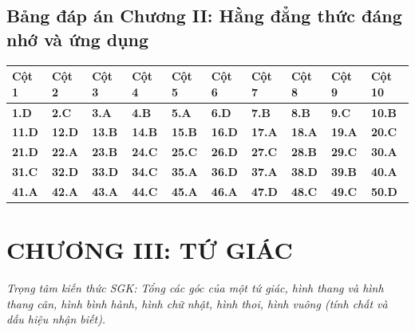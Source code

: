 \documentclass[11pt,a4paper]{article}
\begin{document}
\subsection*{\color{primary} Bảng đáp án Chương II: Hằng đẳng thức đáng nhớ và ứng dụng}
\begin{center}
\renewcommand{\arraystretch}{1.25}
\begin{tabularx}{\textwidth}{*{10}{>{\centering\arraybackslash}X}}
\toprule
\textbf{\color{primary} Cột 1} & \textbf{\color{primary} Cột 2} & \textbf{\color{primary} Cột 3} & \textbf{\color{primary} Cột 4} & \textbf{\color{primary} Cột 5} & \textbf{\color{primary} Cột 6} & \textbf{\color{primary} Cột 7} & \textbf{\color{primary} Cột 8} & \textbf{\color{primary} Cột 9} & \textbf{\color{primary} Cột 10} \\
\midrule
\textbf{1.D} & \textbf{2.C} & \textbf{3.A} & \textbf{4.B} & \textbf{5.A} & \textbf{6.D} & \textbf{7.B} & \textbf{8.B} & \textbf{9.C} & \textbf{10.B} \\
\rowcolor{rowtint} \textbf{11.D} & \textbf{12.D} & \textbf{13.B} & \textbf{14.B} & \textbf{15.B} & \textbf{16.D} & \textbf{17.A} & \textbf{18.A} & \textbf{19.A} & \textbf{20.C} \\
\textbf{21.D} & \textbf{22.A} & \textbf{23.B} & \textbf{24.C} & \textbf{25.C} & \textbf{26.D} & \textbf{27.C} & \textbf{28.B} & \textbf{29.C} & \textbf{30.A} \\
\rowcolor{rowtint} \textbf{31.C} & \textbf{32.D} & \textbf{33.D} & \textbf{34.C} & \textbf{35.A} & \textbf{36.D} & \textbf{37.A} & \textbf{38.D} & \textbf{39.B} & \textbf{40.A} \\
\textbf{41.A} & \textbf{42.A} & \textbf{43.A} & \textbf{44.C} & \textbf{45.A} & \textbf{46.A} & \textbf{47.D} & \textbf{48.C} & \textbf{49.C} & \textbf{50.D} \\
\bottomrule
\end{tabularx}
\end{center}\vspace{10pt}
\section*{\color{primary} CHƯƠNG III: TỨ GIÁC}
\textit{Trọng tâm kiến thức SGK: Tổng các góc của một tứ giác, hình thang và hình thang cân, hình bình hành, hình chữ nhật, hình thoi, hình vuông (tính chất và dấu hiệu nhận biết).}\par\vspace{4pt}
\end{document}
